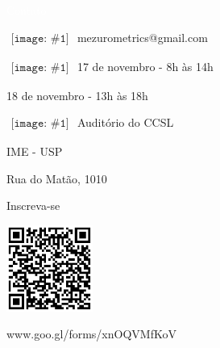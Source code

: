 
\newcommand{\ContactEntry}[2]{
	$\begin{array}{l}
	{\texttt{[image: \#1]}}
	\end{array}
	$ #2
}

\LARGE
\noindent\colorbox{materialGreen}
{\parbox[c][25pt][c]{\textwidth}{\hspace{15pt}\textcolor{white}{Contato}}} %

\begin{multicols}{3}

\large

\ContactEntry{images/green/mail9}{mezurometrics@gmail.com}

\ContactEntry{images/green/black70}{17 de novembro - 8h às 14h

\hspace*{28pt} 18 de novembro - 13h às 18h
}

\columnbreak

\ContactEntry{images/green/house3}{Auditório do CCSL

\hspace*{28pt} IME - USP

\hspace*{28pt} Rua do Matão, 1010}

\columnbreak

\hspace*{25pt} Inscreva-se
\vspace{.2cm}

\hspace*{20pt} \includegraphics[height=80pt]{images/design_sprint_form_qr.png}

\hspace*{2pt} \textcolor{materialGreen}{\small www.goo.gl/forms/xnOQVMfKoV}

\end{multicols}
